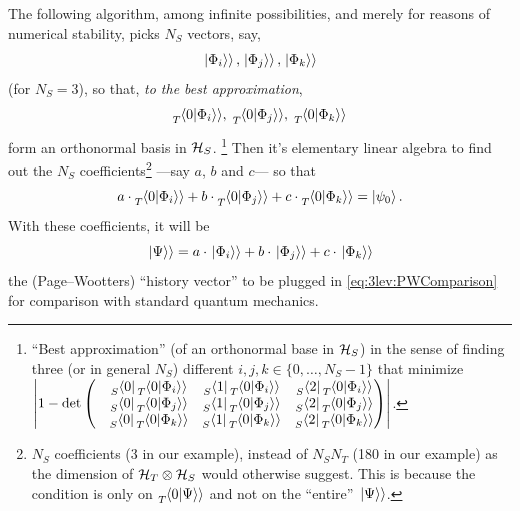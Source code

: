 The following algorithm, among infinite possibilities,
and merely for reasons of numerical stability,
picks $N_S$
vectors, say,
\[
  \left.\left| \Phi_i \right\rangle\right\rangle, \left.\left| \Phi_j \right\rangle\right\rangle, \left.\left| \Phi_k \right\rangle\right\rangle
\]
(for $N_S = 3$),
so that, \emph{to the best approximation},
\[
  \prescript{}{T}{\!\left.\left\langle 0 \middle| \Phi_i \right\rangle\right\rangle}, \;
  \prescript{}{T}{\!\left.\left\langle 0 \middle| \Phi_j \right\rangle\right\rangle}, \;
  \prescript{}{T}{\!\left.\left\langle 0 \middle| \Phi_k \right\rangle\right\rangle}
\]
form an orthonormal basis in $\mathcal{H}_S$.%
\footnote{
  ``Best approximation'' (of an orthonormal base in $\mathcal{H}_S$)
  in the sense of finding
  three (or in general $N_S$) different
  $i, j, k \in \{0, \dots, N_{S}-1\}$ that minimize
  $
    \abs{1 - \det\mqty(
      & \prescript{}{S}{\bra{0}}   \prescript{}{T}{\bradket{0}{\Phi_i}}
      & \prescript{}{S}{\bra{1}}   \prescript{}{T}{\bradket{0}{\Phi_i}}
      & \prescript{}{S}{\bra{2}}   \prescript{}{T}{\bradket{0}{\Phi_i}}
      \\
      & \prescript{}{S}{\bra{0}}   \prescript{}{T}{\bradket{0}{\Phi_j}}
      & \prescript{}{S}{\bra{1}}   \prescript{}{T}{\bradket{0}{\Phi_j}}
      & \prescript{}{S}{\bra{2}}   \prescript{}{T}{\bradket{0}{\Phi_j}}
      \\
      & \prescript{}{S}{\bra{0}}   \prescript{}{T}{\bradket{0}{\Phi_k}}
      & \prescript{}{S}{\bra{1}}   \prescript{}{T}{\bradket{0}{\Phi_k}}
      & \prescript{}{S}{\bra{2}}   \prescript{}{T}{\bradket{0}{\Phi_k}}
    )}
  $.
}
Then it's elementary linear algebra to find out the $N_S$
coefficients\footnote{
  $N_S$ coefficients (3 in our example),
  instead of $N_S N_T$ (180 in our example)
  as the dimension of $\mathcal{H}_T \otimes \mathcal{H}_S$ would otherwise suggest.
  This is because the condition is only on $\prescript{}{T}{\!\left.\left\langle 0 \middle| \Psi \right\rangle\right\rangle}$
  and not on the ``entire'' $\left.\left| \Psi \right\rangle\right\rangle$.
} ---say $a$, $b$ and $c$---
so that \begin{equation}\label{eq:3lev:initialLinEq}
  a\cdot\prescript{}{T}{\!\left.\left\langle 0 \middle| \Phi_i \right\rangle\right\rangle} +
  b\cdot\prescript{}{T}{\!\left.\left\langle 0 \middle| \Phi_j \right\rangle\right\rangle} +
  c\cdot\prescript{}{T}{\!\left.\left\langle 0 \middle| \Phi_k \right\rangle\right\rangle} =
  \ket{\psi_0} .
\end{equation}
With these coefficients, it will be
\begin{equation}\label{eq:3lev:PhiLinearComb}
  \left.\left| \Psi \right\rangle\right\rangle =
  a\cdot\left.\left| \Phi_i \right\rangle\right\rangle +
  b\cdot\left.\left| \Phi_j \right\rangle\right\rangle +
  c\cdot\left.\left| \Phi_k \right\rangle\right\rangle
\end{equation}
the (Page--Wootters) ``history vector'' to be plugged in \eqref{eq:3lev:PWComparison}
for comparison with standard quantum mechanics.

